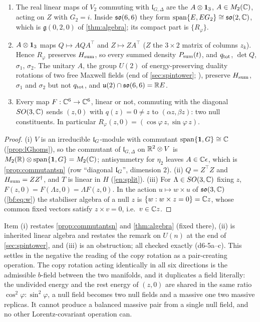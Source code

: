 \begin{proposition}
\label{d6:prop:covariant}
\begin{enumerate}[label=(\roman*),leftmargin=2.2em]
\item The real linear maps of $V_2$ commuting with $\mathfrak l_{G,\Delta}$ are the $A\otimes\mathbf 1_3$, $A\in M_2(\mathbb{C})$, acting on $Z$ with $G_2=i$. Inside
$\mathfrak{so}(6,6)$ they form $\operatorname{span}\{E,EG_2\}\cong\mathfrak{so}(2,\mathbb{C})$, which is $\mathfrak g(0,2,0)$ of \cref{thm:algebra}; its compact part
is $\{R_\varphi\}$.
\item $A\otimes\mathbf 1_3$ maps $Q\mapsto AQA^{\!\top}$ and $Z\mapsto ZA^{\!\top}$ ($Z$ the $3\times2$ matrix of columns $z_k$). Hence $R_\varphi$ preserves
$H_{\rm sum}$, so every summed density $P_{\rm sum}(t)$, and $q_{\rm tot}$, $\det Q$, $\sigma_1$, $\sigma_2$. The unitary $A$, the group $U(2)$ of
energy-preserving duality rotations of two free Maxwell fields (end of \cref{sec:spintower}; \cite{GaillardZumino81}), preserve
$H_{\rm sum}$, $\sigma_1$ and $\sigma_2$ but not $q_{\rm tot}$, and $\mathfrak{u}(2)\cap\mathfrak{so}(6,6)=\mathbb{R} E$.
\item Every map $F:\mathbb{C}^6\to\mathbb{C}^6$, linear or not, commuting with the diagonal $SO(3,\mathbb{C})$ sends $(z,0)$ with $q(z)=0\neq z$ to $(\alpha z,\beta z)$:
two null constituents. In particular $R_\varphi(z,0)=(\cos\varphi\,z,\sin\varphi\,z)$.
\end{enumerate}
\end{proposition}

\begin{proof}
(i) $V$ is an irreducible $\mathfrak l_G$-module with commutant $\operatorname{span}\{\mathbf 1,G\}\cong\mathbb{C}$ (\cref{prop:lGhoms}), so the commutant
of $\mathfrak l_{G,\Delta}$ on $\mathbb{R}^2\otimes V$ is $M_2(\mathbb{R})\otimes\operatorname{span}\{\mathbf 1,G\}=M_2(\mathbb{C})$; antisymmetry for $\eta_2$ leaves $A\in\mathbb{C}\epsilon$, which
is \cref{prop:commutantsn} (row ``diagonal $\mathfrak l_G$'', dimension $2$). (ii) $Q=Z^{\!\top}Z$ and $H_{\rm sum}=ZZ^\dagger$, and $T$ is linear in
$H$ (\cref{en:split}). (iii) For $\Lambda\in SO(3,\mathbb{C})$ fixing $z$, $F(z,0)=F(\Lambda z,0)=\Lambda F(z,0)$. In the action $u\mapsto w\times u$
of $\mathfrak{so}(3,\mathbb{C})$ (\eqref{bf:eq:w}) the stabiliser algebra of a null $z$ is $\{w:w\times z=0\}=\mathbb{C} z$, whose common fixed vectors satisfy
$z\times v=0$, i.e.\ $v\in\mathbb{C} z$.
\end{proof}

Item (i) restates \cref{prop:commutantsn} and \cref{thm:algebra} (fixed there), (ii) is inherited linear algebra and restates the remark
on $U(n)$ at the end of \cref{sec:spintower}, and (iii) is an obstruction; all checked exactly (d6-5a--c). This settles in the negative the reading of the copy rotation
as a pair-creating operation. The copy rotation acting identically in all six directions is the admissible $b$-field between the two manifolds,
and it duplicates a field literally: the undivided energy and the rest energy of $(z,0)$ are shared in the same ratio
$\cos^2\varphi:\sin^2\varphi$, a null field becomes two null fields and a massive one two massive replicas. It cannot produce a balanced massive
pair from a single null field, and no other Lorentz-covariant operation can.

